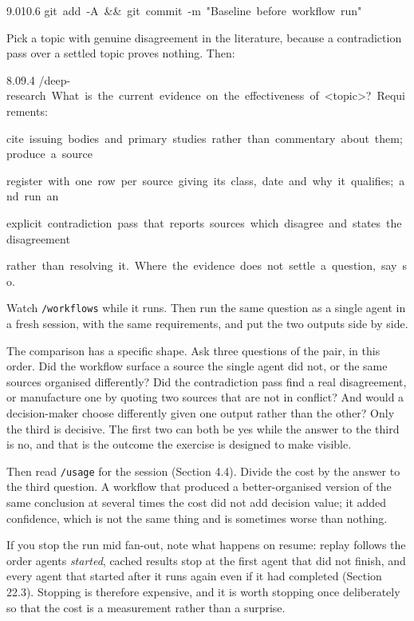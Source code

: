 \documentclass[11pt,a4paper,twoside,openany]{book}
\newcommand{\cl}[1]{\noindent\mbox{#1}\par}
\begin{document}
\begin{codeblock}{9.0}{10.6}
\cl{git~add~-A~\&\&~git~commit~-m~"Baseline~before~workflow~run"}
\end{codeblock}

Pick a topic with genuine disagreement in the literature, because a contradiction pass over a settled topic proves nothing. Then:


\begin{codeblock}{8.0}{9.4}
\cl{/deep-research~What~is~the~current~evidence~on~the~effectiveness~of~<topic>?~Requirements:}
\cl{cite~issuing~bodies~and~primary~studies~rather~than~commentary~about~them;~produce~a~source}
\cl{register~with~one~row~per~source~giving~its~class,~date~and~why~it~qualifies;~and~run~an}
\cl{explicit~contradiction~pass~that~reports~sources~which~disagree~and~states~the~disagreement}
\cl{rather~than~resolving~it.~Where~the~evidence~does~not~settle~a~question,~say~so.}
\end{codeblock}

Watch \texttt{/\allowbreak{}workflows} while it runs. Then run the same question as a single agent in a fresh session, with the same requirements, and put the two outputs side by side.


The comparison has a specific shape. Ask three questions of the pair, in this order. Did the workflow surface a source the single agent did not, or the same sources organised differently? Did the contradiction pass find a real disagreement, or manufacture one by quoting two sources that are not in conflict? And would a decision-maker choose differently given one output rather than the other? Only the third is decisive. The first two can both be yes while the answer to the third is no, and that is the outcome the exercise is designed to make visible.


Then read \texttt{/\allowbreak{}usage} for the session (Section 4.4). Divide the cost by the answer to the third question. A workflow that produced a better-organised version of the same conclusion at several times the cost did not add decision value; it added confidence, which is not the same thing and is sometimes worse than nothing.


If you stop the run mid fan-out, note what happens on resume: replay follows the order agents \emph{started}, cached results stop at the first agent that did not finish, and every agent that started after it runs again even if it had completed (Section 22.3). Stopping is therefore expensive, and it is worth stopping once deliberately so that the cost is a measurement rather than a surprise.
\end{document}
